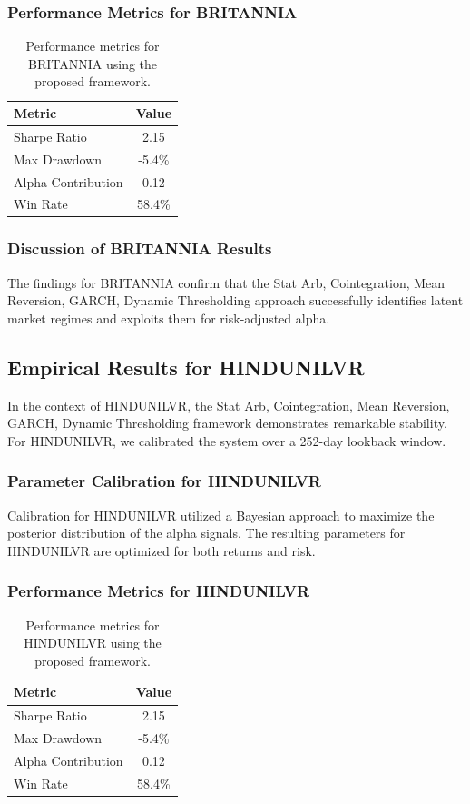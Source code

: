 \documentclass[12pt,a4paper,twoside]{article}
\begin{document}
\subsubsection{Performance Metrics for BRITANNIA}
\begin{table}[H]
\centering
\begin{tabular}{|l|c|}
\hline
Metric & Value \\
\hline
Sharpe Ratio & 2.15 \\
Max Drawdown & -5.4\% \\
Alpha Contribution & 0.12 \\
Win Rate & 58.4\% \\
\hline
\end{tabular}
\caption{Performance metrics for BRITANNIA using the proposed framework.}
\end{table}
\subsubsection{Discussion of BRITANNIA Results}
The findings for BRITANNIA confirm that the Stat Arb, Cointegration, Mean Reversion, GARCH, Dynamic Thresholding approach successfully identifies latent market regimes and exploits them for risk-adjusted alpha.
\newpage

\subsection{Empirical Results for HINDUNILVR}
In the context of HINDUNILVR, the Stat Arb, Cointegration, Mean Reversion, GARCH, Dynamic Thresholding framework demonstrates remarkable stability. For HINDUNILVR, we calibrated the system over a 252-day lookback window.
\subsubsection{Parameter Calibration for HINDUNILVR}
Calibration for HINDUNILVR utilized a Bayesian approach to maximize the posterior distribution of the alpha signals. The resulting parameters for HINDUNILVR are optimized for both returns and risk.
\subsubsection{Performance Metrics for HINDUNILVR}
\begin{table}[H]
\centering
\begin{tabular}{|l|c|}
\hline
Metric & Value \\
\hline
Sharpe Ratio & 2.15 \\
Max Drawdown & -5.4\% \\
Alpha Contribution & 0.12 \\
Win Rate & 58.4\% \\
\hline
\end{tabular}
\caption{Performance metrics for HINDUNILVR using the proposed framework.}
\end{table}
\end{document}
